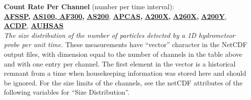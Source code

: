 \begin{hangparagraphs}
\textbf{Count Rate Per Channel }(number per time interval):\textbf{\uline{\label{punch:5-4}\label{punch:5-7}}}\textbf{\uline{}}\\
\textbf{\uline{AFSSP}}\textbf{,
}\textbf{\uline{AS100}}\textbf{\uline{,
AF300}}\textbf{, }\textbf{\uline{AS200}},\textbf{
}\textbf{\uline{APCAS}}\textbf{,
}\textbf{\uline{A200X}}\textbf{,
}\textbf{\uline{A260X}}\textbf{,
}\textbf{\uline{A200Y}}, \textbf{\uline{ACDP}},
\textbf{\uline{AUHSAS}}\\
\emph{The size distribution of the number of particles detected by
a 1D hydrometeor probe per unit time.} These measurements have ``vector''
character in the NetCDF output files, with dimension
equal to the number of channels in the table above and with one entry
per channel. The first element in the vector is a historical remnant
from a time when housekeeping information was stored here and should
be ignored. For the size limits of the channels, see the netCDF attributes
of the following variables for ``Size Distribution''.


\end{hangparagraphs}
